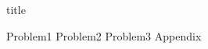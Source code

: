\documentclass{article}
\begin{document}
{title}

\frontmatter

\tableofcontents

\listoffigures
\listoftables

\mainmatter

{Problem1}
{Problem2}
{Problem3}
\newpage
\printbibliography[heading = bibintoc, title = Bibliography] %
\addappendix
{Appendix}

\end{document}
